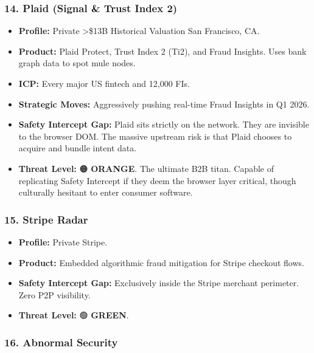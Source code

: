 \documentclass[
]{article}
\providecommand{\tightlist}{%
  \setlength{\itemsep}{0pt}\setlength{\parskip}{0pt}}
\begin{document}
\subsubsection{14. Plaid (Signal \& Trust Index
2)}\label{plaid-signal-trust-index-2}

\begin{itemize}
\tightlist
\item
  \textbf{Profile:} Private \textbar{} \textgreater\$13B Historical
  Valuation \textbar{} San Francisco, CA.
\item
  \textbf{Product:} Plaid Protect, Trust Index 2 (Ti2), and Fraud
  Insights. Uses bank graph data to spot mule nodes.
\item
  \textbf{ICP:} Every major US fintech and 12,000 FIs.
\item
  \textbf{Strategic Moves:} Aggressively pushing real-time Fraud
  Insights in Q1 2026.
\item
  \textbf{Safety Intercept Gap:} Plaid sits strictly on the network.
  They are invisible to the browser DOM. The massive upstream risk is
  that Plaid chooses to acquire and bundle intent data.
\item
  \textbf{Threat Level:} 🟠 \textbf{ORANGE}. The ultimate B2B titan.
  Capable of replicating Safety Intercept if they deem the browser layer
  critical, though culturally hesitant to enter consumer software.
\end{itemize}

\subsubsection{15. Stripe Radar}\label{stripe-radar}

\begin{itemize}
\tightlist
\item
  \textbf{Profile:} Private \textbar{} Stripe.
\item
  \textbf{Product:} Embedded algorithmic fraud mitigation for Stripe
  checkout flows.
\item
  \textbf{Safety Intercept Gap:} Exclusively inside the Stripe merchant
  perimeter. Zero P2P visibility.
\item
  \textbf{Threat Level:} 🟢 \textbf{GREEN}.
\end{itemize}

\subsubsection{16. Abnormal Security}\label{abnormal-security}
\end{document}
